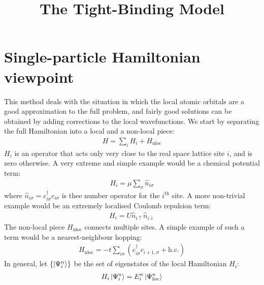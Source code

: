\documentclass[12pt]{article}
\title{The Tight-Binding Model}
\author{}
\numberwithin{equation}{section}
\begin{document}
\maketitle
\section*{Single-particle Hamiltonian viewpoint}
This method deals with the situation in which the local atomic orbitals are a good approximation to the full problem, and fairly good solutions can be obtained by adding corrections to the local wavefunctions. We start by separating the full Hamiltonian into a local and a non-local piece:
\begin{equation}\begin{aligned}
	H = \sum_i H_i + H_\text{nloc}
\end{aligned}\end{equation}
$H_i$ is an operator that acts only very close to the real space lattice site \(i\), and is zero otherwise. A very extreme and simple example would be a chemical potential term:
\begin{equation}\begin{aligned}
	H_i = \mu \sum_{\sigma} \hat n_{i\sigma}
\end{aligned}\end{equation}
where \(\hat n_{i\sigma} = c^\dagger_{i \sigma}c_{i \sigma}\) is thee number operator for the $i^\text{th}$ site.
A more non-trivial example would be an extremely localised Coulomb repulsion term:
\begin{equation}\begin{aligned}
	H_i =  U\hat n_{i \uparrow}\hat n_{i \downarrow}
\end{aligned}\end{equation}
The non-local piece $H_\text{nloc}$ connects multiple sites. A simple example of such a term would be a nearest-neighbour hopping:
\begin{equation}\begin{aligned}
	H_\text{nloc} =  -t\sum_{i\sigma} \left(c^\dagger_{i\sigma}c_{i+1,\sigma} + \text{h.c.}\right)
\end{aligned}\end{equation}
In general, let $\left\{\ket{\Psi^n_i}\right\}$ be the set of eigenstates of the local Hamiltonian \(H_i\):
\begin{equation}\begin{aligned}
	H_i \ket{\Psi_i^n} = E^n_i\ket{\Psi_\text{loc}^n}
\end{aligned}\end{equation}
\end{document}
